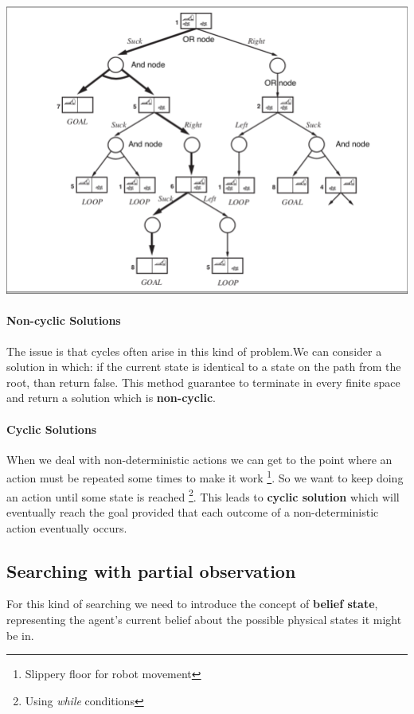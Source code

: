 \documentclass[5pt,a4paper]{article}
\begin{document}
\begin{itemize}
\includegraphics[scale=0.5]{images/And-or-tree.png} 

\paragraph{Non-cyclic Solutions} The issue is that cycles often arise in this kind of problem.We can consider a solution in which: if the current state is identical to a state on the path from the root, than return false. This method guarantee to terminate in every finite space and return a solution which is \textbf{non-cyclic}.

\paragraph{Cyclic Solutions}
When we deal with non-deterministic actions we can get to the point where an action must be repeated some times to make it work \footnote{Slippery floor for robot movement}. So we want to keep doing an action until some state is reached \footnote{Using \textit{while} conditions}. This leads to \textbf{cyclic solution} which will eventually reach the goal provided that each outcome of a non-deterministic action eventually occurs.




\subsection{Searching with partial observation}
For this kind of searching we need to introduce the concept of \textbf{belief state}, representing the agent's current belief about the possible physical states it might be in.


\end{itemize}
\end{document}
